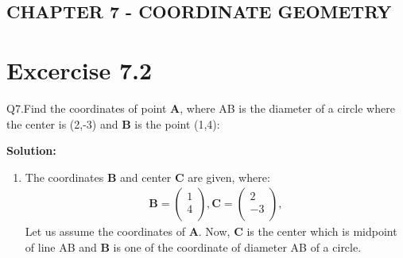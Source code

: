 \documentclass[12pt]{article}
\newcommand{\solution}{\noindent \textbf{Solution: }}
\newcommand{\myvec}[1]{\ensuremath{\begin{pmatrix}#1\end{pmatrix}}}
\let\vec\mathbf
\begin{document}
\begin{center}
\section*{CHAPTER 7 - COORDINATE GEOMETRY}

\end{center}
\section*{Excercise 7.2}

Q7.Find the coordinates of point $\vec{A}$, where AB is the diameter of a circle where the center is (2,-3) and $\vec{B}$ is the point (1,4):

\solution
\begin{enumerate}
\item The coordinates $\vec{B}$ and center $\vec{C}$ are given, where:
	\begin{align}
	\vec{B} = \myvec{
		1\\
	    4\\
		},
	\vec{C} = \myvec{
	    2\\
	   -3\\
		},
	\end{align}
Let us assume the coordinates of $\vec{A}$. Now, $\vec{C}$ is the center which is midpoint of line AB and $\vec{B}$ is one of the coordinate of diameter AB of a circle.
		

\end{enumerate}
\end{document}
